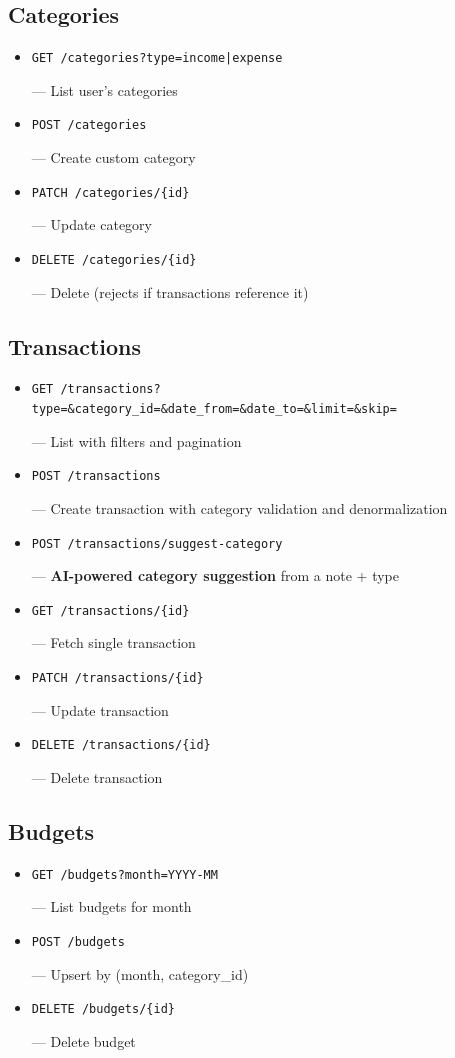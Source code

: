 \documentclass[11pt,a4paper]{article}
\newcommand{\code}[1]{\colorbox{codebg}{\strut\texttt{\small #1}}}
\begin{document}
\subsection{Categories}
\begin{itemize}[leftmargin=*,itemsep=1pt]
  \item \code{GET /categories?type=income|expense} --- List user's categories
  \item \code{POST /categories} --- Create custom category
  \item \code{PATCH /categories/\{id\}} --- Update category
  \item \code{DELETE /categories/\{id\}} --- Delete (rejects if transactions reference it)
\end{itemize}

\subsection{Transactions}
\begin{itemize}[leftmargin=*,itemsep=1pt]
  \item \code{GET /transactions?type=\&category\_id=\&date\_from=\&date\_to=\&limit=\&skip=} --- List with filters and pagination
  \item \code{POST /transactions} --- Create transaction with category validation and denormalization
  \item \code{POST /transactions/suggest-category} --- \textbf{AI-powered category suggestion} from a note + type
  \item \code{GET /transactions/\{id\}} --- Fetch single transaction
  \item \code{PATCH /transactions/\{id\}} --- Update transaction
  \item \code{DELETE /transactions/\{id\}} --- Delete transaction
\end{itemize}

\subsection{Budgets}
\begin{itemize}[leftmargin=*,itemsep=1pt]
  \item \code{GET /budgets?month=YYYY-MM} --- List budgets for month
  \item \code{POST /budgets} --- Upsert by (month, category\_id)
  \item \code{DELETE /budgets/\{id\}} --- Delete budget
\end{itemize}
\end{document}
